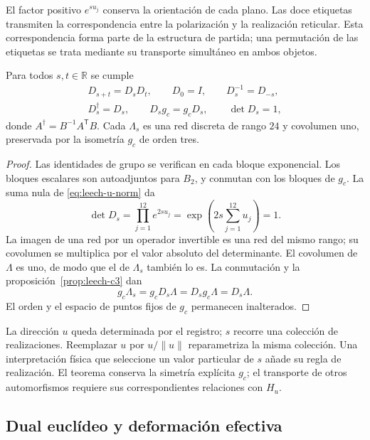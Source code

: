 El factor positivo \(e^{su_j}\) conserva la orientación de cada
plano. Las doce etiquetas transmiten la correspondencia entre la
polarización y la realización reticular. Esta correspondencia
forma parte de la estructura de partida; una permutación de las
etiquetas se trata mediante su transporte simultáneo en ambos objetos.

\begin{theorem}
\label{thm:leech-flow}
Para todos \(s,t\in\mathbb R\) se cumple
\[
\begin{gathered}
 D_{s+t}=D_sD_t,\qquad D_0=I,\qquad D_s^{-1}=D_{-s},\\
 D_s^\dagger=D_s,\qquad D_sg_c=g_cD_s,\qquad \det D_s=1,
\end{gathered}
\]
donde \(A^\dagger=B^{-1}A^{\mathsf T}B\).
Cada \(\Lambda_s\) es una red discreta de rango \(24\) y covolumen
uno, preservada por la isometría \(g_c\) de orden tres.
\end{theorem}
\begin{proof}
Las identidades de grupo se verifican en cada bloque exponencial.
Los bloques escalares son autoadjuntos para \(B_2\), y conmutan
con los bloques de \(g_c\). La suma nula de
\eqref{eq:leech-u-norm} da
\[
 \det D_s=\prod_{j=1}^{12}e^{2su_j}
 =\exp\left(2s\sum_{j=1}^{12}u_j\right)=1.
\]
La imagen de una red por un operador invertible es una red del
mismo rango; su covolumen se multiplica por el valor absoluto del
determinante. El covolumen de \(\Lambda\) es uno, de modo que el
de \(\Lambda_s\) también lo es. La conmutación y
la proposición~\ref{prop:leech-c3} dan
\[
 g_c\Lambda_s=g_cD_s\Lambda=D_sg_c\Lambda=D_s\Lambda.
\]
El orden y el espacio de puntos fijos de \(g_c\) permanecen
inalterados.
\end{proof}

\begin{remark}
La dirección \(u\) queda determinada por el registro; \(s\) recorre
una colección de realizaciones. Reemplazar \(u\) por \(u/\|u\|\)
reparametriza la misma colección. Una interpretación física que
seleccione un valor particular de \(s\) añade su regla de realización.
El teorema conserva la simetría explícita \(g_c\); el transporte de
otros automorfismos requiere sus correspondientes relaciones con
\(H_u\).
\end{remark}

\subsection{Dual euclídeo y deformación efectiva}
\label{subsec:leech-dual}

